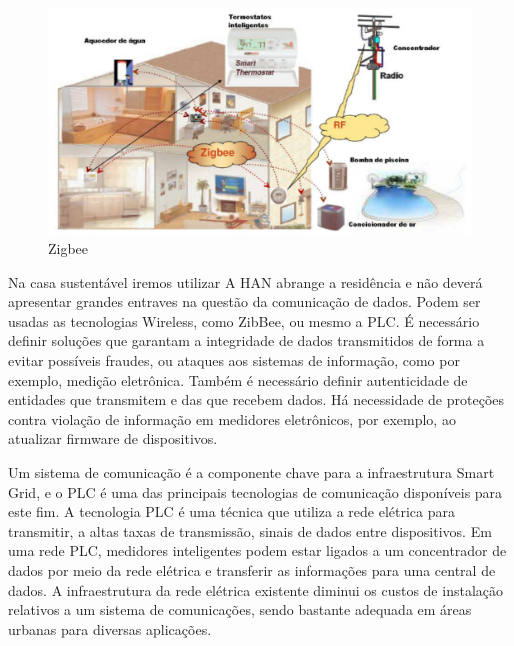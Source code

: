 \begin{figure}[H]
 \begin{center}
	\includegraphics[keepaspectratio]{figuras/zigbee.eps}
	\caption{Zigbee}
 \end{center}
\end{figure}

	Na casa sustentável iremos utilizar A HAN abrange a residência e não deverá apresentar grandes entraves na questão da comunicação de dados. Podem ser usadas as tecnologias Wireless, como ZibBee, ou mesmo a PLC. É necessário definir soluções que garantam a integridade de dados transmitidos de forma a evitar possíveis fraudes, ou ataques aos sistemas de informação, como por exemplo, medição eletrônica. Também é necessário definir autenticidade de entidades que transmitem e das que recebem dados. Há necessidade de proteções contra violação de informação em medidores eletrônicos, por exemplo, ao atualizar firmware de dispositivos\cite{2013Atmel}\cite{2013RiveraEspositoTeixeira}.

	Um sistema de comunicação é a componente chave para a infraestrutura Smart Grid, e o PLC é uma das principais tecnologias de comunicação disponíveis para este fim. A tecnologia PLC é uma técnica que utiliza a rede elétrica para transmitir, a altas taxas de transmissão, sinais de dados entre dispositivos. Em uma rede PLC, medidores inteligentes podem estar ligados a um concentrador de dados por meio da rede elétrica e transferir as informações para uma central de dados. A infraestrutura da rede elétrica existente diminui os custos de instalação relativos a um sistema de comunicações, sendo bastante adequada em áreas urbanas para diversas aplicações.

